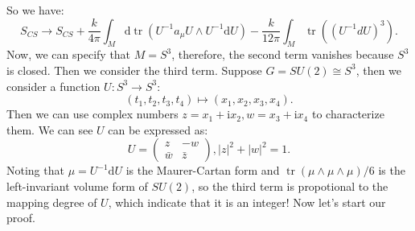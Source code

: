 \documentclass{book}
\begin{document}
So we have:
\begin{equation}
S_{CS}\rightarrow S_{CS} +\frac{k}{4\pi }\int _{M}\mathrm{d}\operatorname{tr} (U^{-1} a_{\mu } U\land U^{-1}\mathrm{d} U)-\frac{k}{12\pi }\int _{M}\operatorname{tr} ((U^{-1} dU)^{3} ).
\label{eq:gaugeTransformationOfCSAction}
\end{equation}
Now, we can specify that $M=S^{3}$, therefore, the second term vanishes because $S^{3}$ is closed. Then we consider the third term. Suppose $G=SU( 2) \cong S^{3}$, then we consider a function $U:S^{3}\rightarrow S^{3}$:
\begin{equation*}
( t_{1} ,t_{2} ,t_{3} ,t_{4}) \mapsto ( x_{1} ,x_{2} ,x_{3} ,x_{4}) .
\end{equation*}
Then we can use complex numbers $z=x_{1} +\mathrm{i} x_{2} ,w=x_{3} +\mathrm{i} x_{4}$ to characterize them. We can see $U$ can be expressed as:
\begin{equation*}
U=\begin{pmatrix}
z & -w\\
\bar{w} & \bar{z}
\end{pmatrix} ,| z| ^{2} +| w| ^{2} =1.
\end{equation*}
Noting that $\mu =U^{-1}\mathrm{d} U$ is the Maurer-Cartan form and $\operatorname{tr} (\mu \land \mu \land \mu )/6$ is the left-invariant volume form of $SU( 2)$, so the third term is propotional to the mapping degree of $U$, which indicate that it is an integer! Now let's start our proof.
\end{document}
